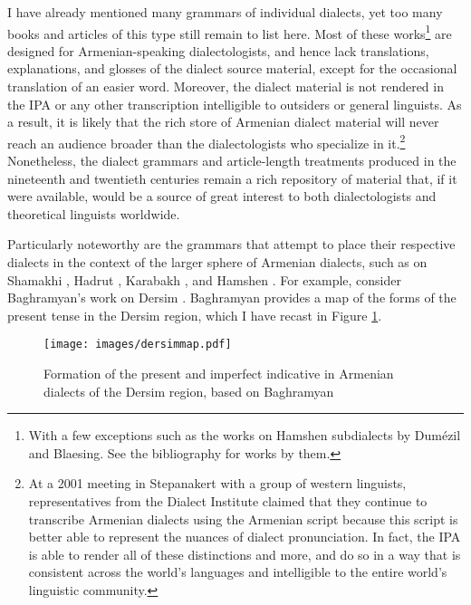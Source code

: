 \documentclass[output=paper]{langscibook}
\begin{document}
I have already mentioned many grammars of individual dialects, yet too many books and articles of this type still remain to list here. Most of these works\footnote{With a few exceptions such as the works on Hamshen subdialects by  Dumézil and Blaesing. See the bibliography for works by them.}  are designed for Armenian\hyp speaking dialectologists, and hence lack translations, explanations, and glosses of the dialect source material, except for the occasional translation of an easier word. Moreover, the dialect material is not rendered in the IPA or any other transcription intelligible to outsiders or general linguists. As a result, it is likely that the rich store of Armenian dialect material will never reach an audience broader than the dialectologists who specialize in it.\footnote{At a 2001 meeting in Stepanakert with a group of western linguists, representatives from the Dialect Institute claimed that they continue to transcribe Armenian dialects using the Armenian script because this script is better able to represent the nuances of dialect pronunciation. In fact, the IPA is able to render all of these distinctions and more, and do so in a way that is consistent across the world's languages and intelligible to the entire world's linguistic community.}  Nonetheless, the dialect grammars and article-length treatments produced in the nineteenth and twentieth centuries remain a rich repository of material that, if it were available, would be a source of great interest to both dialectologists and theoretical linguists worldwide.


Particularly noteworthy are the grammars that attempt to place their respective dialects in the context of the larger sphere of Armenian dialects, such as  on    Shamakhi \citep{Baghramyan-1964-ShamakhiDialect},  Hadrut \citep{Poghosyan-1965-DialectHadrut}, Karabakh \citep{Davtyan-1966-KarabakhDialectMap}, and Hamshen \citep{Blasing-2003-aspectsArmenianTurkishlanguagecontactsHamshenarea}. For example, consider Baghramyan's work on Dersim \citep{Baghramyan-1960-DersimDialect}.  Baghramyan provides a  map of the forms of the present tense in the Dersim region, which I have recast in Figure \ref{fig:vaux:dersim}. 



\begin{figure}
    \caption{Formation of the present and imperfect indicative in Armenian dialects of the Dersim region, based on Baghramyan \citep[map 2]{Baghramyan-1960-DersimDialect}}
    \label{fig:vaux:dersim}
\texttt{[image: images/dersimmap.pdf]}
\end{figure} 
\end{document}
